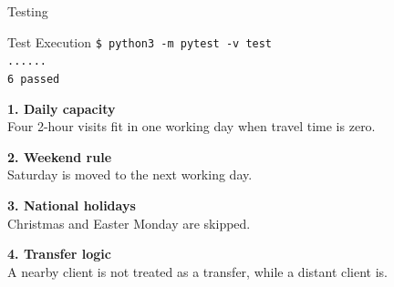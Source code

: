 \begin{frame}[fragile]{Testing}
\begin{block}{Test Execution}
\texttt{\$ python3 -m pytest -v test}\\
\texttt{......}\\
\texttt{6 passed}
\end{block}

\vspace{0.2cm}
\footnotesize
\textbf{1. Daily capacity}\\
Four 2-hour visits fit in one working day when travel time is zero.

\vspace{0.15cm}
\textbf{2. Weekend rule}\\
Saturday is moved to the next working day.

\vspace{0.15cm}
\textbf{3. National holidays}\\
Christmas and Easter Monday are skipped.

\vspace{0.15cm}
\textbf{4. Transfer logic}\\
A nearby client is not treated as a transfer, while a distant client is.

\vspace{0.25cm}
\end{frame}
